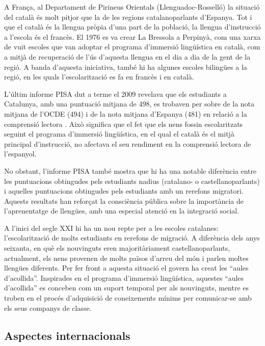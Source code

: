 \documentclass[]{../../metanetpaper}
\begin{document}
\begin{multicols}{2}
A França, al Departament de Pirineus Orientals (Llenguadoc-Rosselló) la situació del català és molt pitjor que la de les regions catalanoparlants d’Espanya. Tot i que el català és la llengua pròpia d’una part de la població, la llengua d’instrucció a l’escola és el francès. El 1976 es va crear La Bressola \cite{CAT-Nota6} a Perpinyà, com una xarxa de vuit escoles que van adoptar el programa d’immersió lingüística en català, com a mitjà de recuperació de l’ús d’aquesta llengua en el dia a dia de la gent de la regió. A banda d’aquesta iniciativa, també hi ha algunes escoles bilingües a la regió, en les quals l’escolarització es fa en francès i en català.

L’últim informe PISA dut a terme el 2009 revelava que els estudiants a Catalunya, amb una puntuació mitjana de 498, es trobaven per sobre de la nota mitjana de l’OCDE (494) i de la nota mitjana d’Espanya (481) en relació a la comprensió lectora \cite{CAT-Nota7}. Això significa que el fet que els nens fossin escolaritzats seguint el programa d’immersió lingüística, en el qual el català és el mitjà principal d’instrucció, no afectava el seu rendiment en la comprensió lectora de l’espanyol.

No obstant, l’informe PISA també mostra que hi ha una notable diferència entre les puntuacions obtingudes pels estudiants nadius (catalano- o castellanoparlants) i aquelles puntuacions obtingudes pels estudiants amb un rerefons migratori. Aquests resultats han reforçat la consciència pública sobre la importància de l’aprenentatge de llengües, amb una especial atenció en la integració social. 

A l’inici del segle XXI hi ha un nou repte per a les escoles catalanes: l’escolarització de molts estudiants en rerefons de migració. A diferència dels anys seixanta, en què els nouvinguts eren majoritàriament castellanoparlants, actualment, els nens provenen de molts països d’arreu del món i parlen moltes llengües diferents. Per fer front a aquesta situació el govern ha creat les “aules d’acollida”. Inspirades en el programa d’immersió lingüística, aquestes “aules d’acollida” es conceben com un suport temporal per als nouvinguts, mentre es troben en el procés d’adquisició de coneixements mínims per comunicar-se amb els seus companys de classe.

\subsection{Aspectes internacionals}


\end{multicols}
\end{document}
